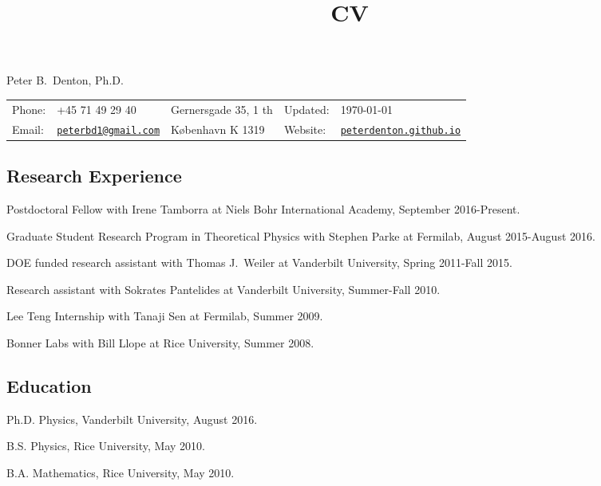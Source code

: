\documentclass[letterpaper]{article}
\title{CV}
\newif\ifhtlatex
\def\name{Peter B.~Denton, Ph.D.}
\renewenvironment{itemize}{
\begin{list}{}{
\setlength{\leftmargin}{1.5em}
}
}{
\end{list}
}
\begin{document}
\ifhtlatex
\Tag{TITLE+}{CV}
\fi

{\huge \name}

\vspace{0.1in}

\begin{tabular}{ll|l|ll}
Phone: & +45 71 49 29 40 & Gernersgade 35, 1 th & Updated: & \today\\
Email: & \href{mailto:peterbd1@gmail.com}{\tt peterbd1@gmail.com} & København K 1319 & Website: & 
\href{http://peterdenton.github.io}{\tt peterdenton.github.io}
\end{tabular}

\subsection*{Research Experience}
\begin{itemize}
\item Postdoctoral Fellow with Irene Tamborra at Niels Bohr International Academy, September 2016-Present.
\item Graduate Student Research Program in Theoretical Physics with Stephen Parke at Fermilab, August 2015-August 2016.
\item DOE funded research assistant with Thomas J.~Weiler at Vanderbilt University, Spring 2011-Fall 2015.
\item Research assistant with Sokrates Pantelides at Vanderbilt University, Summer-Fall 2010.
\item Lee Teng Internship with Tanaji Sen at Fermilab, Summer 2009.
\item Bonner Labs with Bill Llope at Rice University, Summer 2008.
\end{itemize}

\subsection*{Education}
\begin{itemize}
\item Ph.D. Physics, Vanderbilt University, August 2016.
\item B.S. Physics, Rice University, May 2010.
\item B.A. Mathematics, Rice University, May 2010.
\end{itemize}
\end{document}
